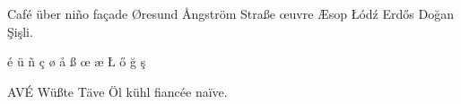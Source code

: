 \documentclass{article}
\begin{document}
Café über niño façade Øresund Ångström Straße œuvre Æsop Łódź Erdős Doğan Şişli.

é ü ñ ç ø å ß œ æ Ł ő ğ ş

AVÉ Wüßte Täve Öl kühl fiancée naïve.
\end{document}
